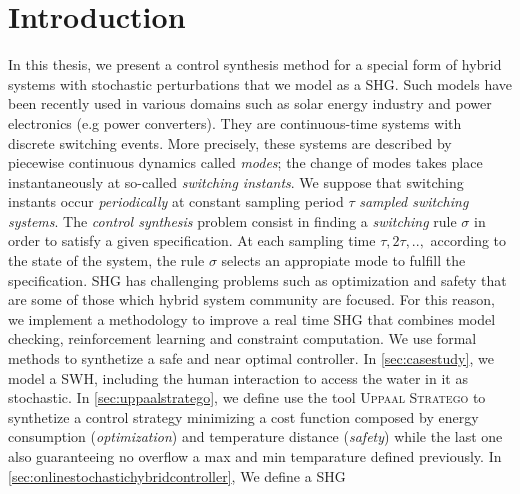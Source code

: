     \chapter{Introduction}
    
    \label{ch:intro}
    In this thesis, we present a control synthesis method for a special 
    form of hybrid systems with stochastic perturbations that we model as
    a \ac{SHG}. Such models have been 
    recently used in various domains such as solar energy industry and power 
    electronics (e.g power converters). They are continuous-time systems
    with discrete switching events. More precisely, these systems are 
    described by piecewise continuous dynamics called \emph{modes}; the 
    change of modes takes place instantaneously at so-called \emph{switching
    instants}. We suppose that switching instants occur \emph{periodically}
    at constant sampling period $\tau$ \emph{sampled switching systems}.
    The \emph{control synthesis} problem consist in finding a \emph{switching}
    rule $\sigma$ in order to satisfy a given specification. At each sampling
    time $\tau, 2\tau,..,$ according to the state of the system, the rule 
    $\sigma$ selects an appropiate mode to fulfill the specification.
    \ac{SHG} has challenging problems such as optimization and safety that
    are some of those which hybrid system community are focused. For this reason,
    we implement a methodology to improve a real time \ac{SHG} that combines
    model checking, reinforcement learning and constraint computation. We 
    use formal methods to synthetize a safe and near optimal controller. 
    In \autoref{sec:casestudy}, we model a \ac{SWH}, including 
    the human interaction to access the water 
    in it as stochastic. In \autoref{sec:uppaalstratego}, we define 
    use the tool \textsc{Uppaal Stratego} to synthetize
    a control strategy minimizing a cost function composed by energy consumption
    (\emph{optimization}) and temperature distance (\emph{safety}) while the last
    one also guaranteeing no overflow a max and min temparature defined previously.
    In \autoref{sec:onlinestochastichybridcontroller}, We define a \ac{SHG}
    

